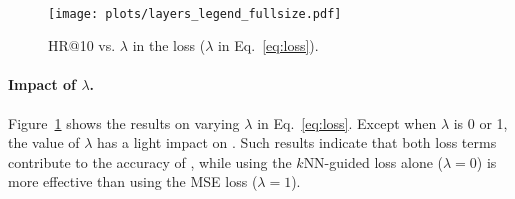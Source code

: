 \begin{figure}[ht]
     
    \hspace*{-2mm}
     \hspace*{-2mm}
     \\ \vspace{-2mm}
    \hspace*{-2mm}
    \hspace*{5mm}
    \texttt{[image: plots/layers\_legend\_fullsize.pdf]}  \\

    \caption{HR@10 vs. $\lambda$ in the loss ($\lambda$ in Eq.~\eqref{eq:loss}).}\label{fig:exp_lambdas}
\end{figure}

\paragraph{Impact of $\lambda$.} 
Figure~\ref{fig:exp_lambdas} shows the results on varying $\lambda$ in Eq.~\eqref{eq:loss}. Except when $\lambda$ is 0 or 1, the value of $\lambda$ has a light impact on \model.
Such results indicate that both loss terms contribute to the accuracy of \model, while using the $k$NN-guided loss alone ($\lambda=0$) is more effective than using the MSE loss ($\lambda=1$).

